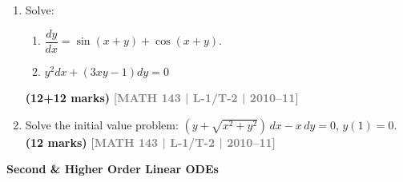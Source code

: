 \documentclass[12pt,a4paper]{article}
\newcommand{\yr}[1]{\hfill\textcolor{gray}{\small\textbf{[#1]}}}
\newcommand{\mk}[1]{\textcolor{orange!70!black}{\small\textbf{(#1 marks)}}}
\newcommand{\subtopic}[2]{%
  \vspace{10pt}
  \noindent\begin{tcolorbox}[colback=#1!8,colframe=#1,boxrule=0.6pt,arc=4pt,
    left=6pt,right=6pt,top=4pt,bottom=4pt]
    \small\bfseries\textcolor{#1}{#2}
  \end{tcolorbox}
  \vspace{2pt}
}
\begin{document}
\begin{enumerate}
\item Solve: 
\begin{enumerate}
\item $\dfrac{dy}{dx}=\sin(x+y)+\cos(x+y)$.
\item  $y^2 dx + (3xy - 1)dy = 0$
\end{enumerate}

\mk{12+12} \yr{MATH 143 | L-1/T-2 | 2010--11}

\item Solve the initial value problem: $(y+\sqrt{x^{2}+y^{2}})\,dx - x\,dy = 0$, $y(1)=0$.
\mk{12\textonehalf} \yr{MATH 143 | L-1/T-2 | 2010--11}

\end{enumerate}

\subtopic{cC}{Second \& Higher Order Linear ODEs}
\label{sub:s3-linear}
\end{document}
